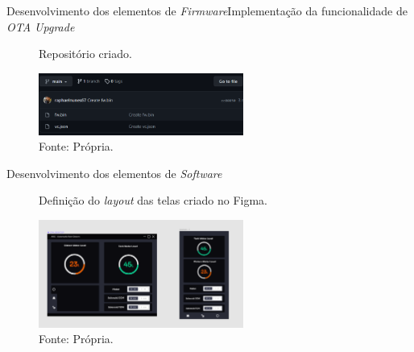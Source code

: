\begin{frame}{Desenvolvimento dos elementos de \textit{Firmware}}{Implementação da funcionalidade de \textit{OTA Upgrade}}
  \begin{figure}[H]
    \centering
    \caption{Repositório criado.}
    \includegraphics[width=0.6\textwidth]{figuras/repositorio_bin.png}
    \caption*{\tiny{Fonte: Própria.}}
    \label{fig:reposi}
  \end{figure}
  
\end{frame}

\begin{frame}{Desenvolvimento dos elementos de \textit{Software}}
  \begin{figure}[H]
    \centering
    \caption{Definição do \textit{layout} das telas criado no Figma.}
    \includegraphics[width=0.6\textwidth]{figuras/figma_plan.png}
    \caption*{\tiny{Fonte: Própria.}}
    \label{fig:figma_plan_desktop}
  \end{figure}
  
\end{frame}